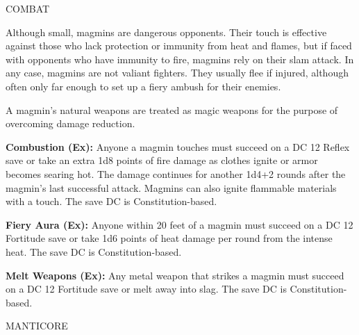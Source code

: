 \documentclass{article}
\begin{document}
COMBAT

Although small, magmins are dangerous opponents. Their touch is effective against 
those who lack protection or immunity from heat and flames, but if faced with opponents 
who have immunity to fire, magmins rely on their slam attack. In any case, magmins 
are not valiant fighters. They usually flee if injured, although often only far 
enough to set up a fiery ambush for their enemies.

A magmin's natural weapons are treated as magic weapons for the purpose of overcoming 
damage reduction.

\textbf{Combustion (Ex):} Anyone a magmin touches must succeed on a DC 12 Reflex 
save or take an extra 1d8 points of fire damage as clothes ignite or armor becomes 
searing hot. The damage continues for another 1d4+2 rounds after the magmin's last 
successful attack. Magmins can also ignite flammable materials with a touch. The 
save DC is Constitution-based.

\textbf{Fiery Aura (Ex): }Anyone within 20 feet of a magmin must succeed on a DC 
12 Fortitude save or take 1d6 points of heat damage per round from the intense 
heat. The save DC is Constitution-based.

\textbf{Melt Weapons (Ex):} Any metal weapon that strikes a magmin must succeed 
on a DC 12 Fortitude save or melt away into slag. The save DC is Constitution-based.

\vspace{12pt}
{\LARGE{}MANTICORE}
\end{document}
